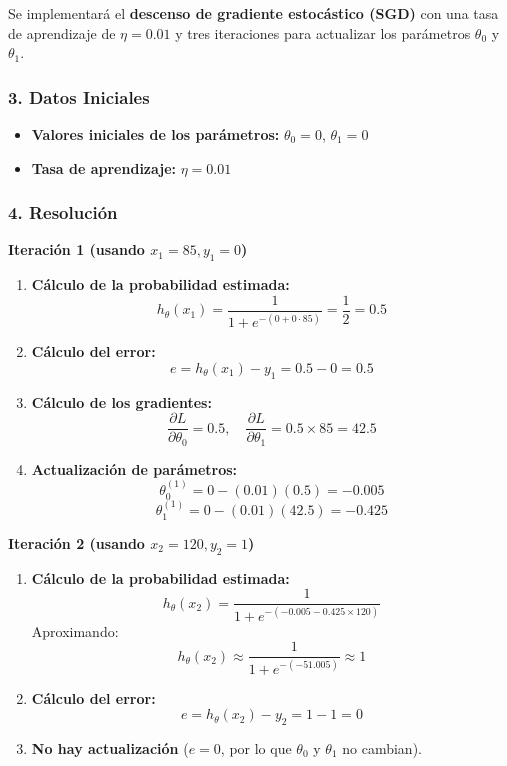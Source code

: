 \documentclass{article}
\begin{document}
Se implementará el \textbf{descenso de gradiente estocástico (SGD)} con una tasa de aprendizaje de \( \eta = 0.01 \) y tres iteraciones para actualizar los parámetros \( \theta_0 \) y \( \theta_1 \).

\subsubsection*{3. Datos Iniciales}

\begin{itemize}
	\item \textbf{Valores iniciales de los parámetros:} \( \theta_0 = 0 \), \( \theta_1 = 0 \)
	\item \textbf{Tasa de aprendizaje:} \( \eta = 0.01 \)
\end{itemize}

\subsubsection*{4. Resolución}

\textbf{Iteración 1 (usando \( x_1 = 85, y_1 = 0 \))}

\begin{enumerate}
	\item \textbf{Cálculo de la probabilidad estimada:}
	\[
	h_\theta(x_1) = \frac{1}{1 + e^{-(0 + 0 \cdot 85)}} = \frac{1}{2} = 0.5
	\]
	
	\item \textbf{Cálculo del error:}
	\[
	e = h_\theta(x_1) - y_1 = 0.5 - 0 = 0.5
	\]
	
	\item \textbf{Cálculo de los gradientes:}
	\[
	\frac{\partial L}{\partial \theta_0} = 0.5, \quad \frac{\partial L}{\partial \theta_1} = 0.5 \times 85 = 42.5
	\]
	
	\item \textbf{Actualización de parámetros:}
	\[
	\theta_0^{(1)} = 0 - (0.01)(0.5) = -0.005
	\]
	\[
	\theta_1^{(1)} = 0 - (0.01)(42.5) = -0.425
	\]
\end{enumerate}

\textbf{Iteración 2 (usando \( x_2 = 120, y_2 = 1 \))}

\begin{enumerate}
	\item \textbf{Cálculo de la probabilidad estimada:}
	\[
	h_\theta(x_2) = \frac{1}{1 + e^{-(-0.005 - 0.425 \times 120)}}
	\]
	Aproximando:
	\[
	h_\theta(x_2) \approx \frac{1}{1 + e^{-(-51.005)}} \approx 1
	\]
	
	\item \textbf{Cálculo del error:}
	\[
	e = h_\theta(x_2) - y_2 = 1 - 1 = 0
	\]
	
	\item \textbf{No hay actualización} (\( e = 0 \), por lo que \( \theta_0 \) y \( \theta_1 \) no cambian).
\end{enumerate}
\end{document}
